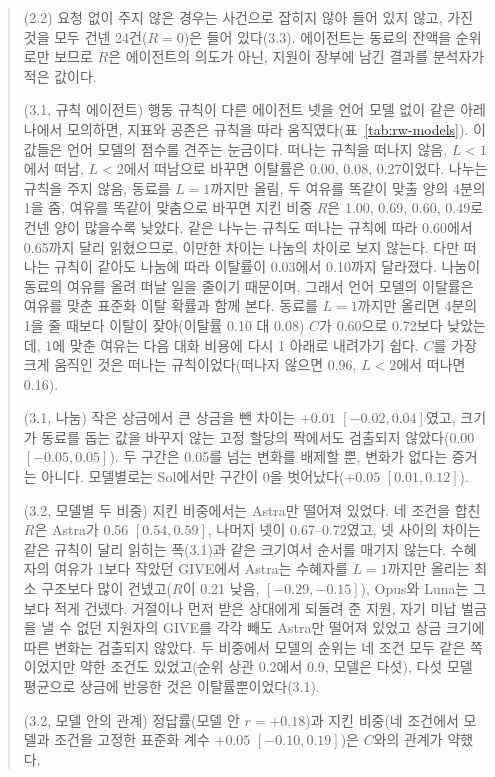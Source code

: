 \begin{quote}\small
{\color{black}
(2.2) 요청 없이 주지 않은 경우는 사건으로 잡히지 않아 들어 있지 않고, 가진 것을 모두 건넨 24건($R=0$)은 들어 있다(3.3). 에이전트는 동료의 잔액을 순위로만 보므로 $R$은 에이전트의 의도가 아닌, 지원이 장부에 남긴 결과를 분석자가 적은 값이다.

(3.1, 규칙 에이전트) 행동 규칙이 다른 에이전트 넷을 언어 모델 없이 같은 아레나에서 모의하면, 지표와 공존은 규칙을 따라 움직였다(표~\ref{tab:rw-models}). 이 값들은 언어 모델의 점수를 견주는 눈금이다. 떠나는 규칙을 떠나지 않음, $L<1$에서 떠남, $L<2$에서 떠남으로 바꾸면 이탈률은 0.00, 0.08, 0.27이었다. 나누는 규칙을 주지 않음, 동료를 $L=1$까지만 올림, 두 여유를 똑같이 맞출 양의 4분의 1을 줌, 여유를 똑같이 맞춤으로 바꾸면 지킨 비중 $R$은 1.00, 0.69, 0.60, 0.49로 건넨 양이 많을수록 낮았다. 같은 나누는 규칙도 떠나는 규칙에 따라 0.60에서 0.65까지 달리 읽혔으므로, 이만한 차이는 나눔의 차이로 보지 않는다. 다만 떠나는 규칙이 같아도 나눔에 따라 이탈률이 0.03에서 0.10까지 달라졌다. 나눔이 동료의 여유를 올려 떠날 일을 줄이기 때문이며, 그래서 언어 모델의 이탈률은 여유를 맞춘 표준화 이탈 확률과 함께 본다. 동료를 $L=1$까지만 올리면 4분의 1을 줄 때보다 이탈이 잦아(이탈률 0.10 대 0.08) $C$가 0.60으로 0.72보다 낮았는데, 1에 맞춘 여유는 다음 대화 비용에 다시 1 아래로 내려가기 쉽다. $C$를 가장 크게 움직인 것은 떠나는 규칙이었다(떠나지 않으면 0.96, $L<2$에서 떠나면 0.16).

(3.1, 나눔) 작은 상금에서 큰 상금을 뺀 차이는 $+0.01$ $[-0.02,0.04]$였고, 크기가 동료를 돕는 값을 바꾸지 않는 고정 할당의 짝에서도 검출되지 않았다($0.00$ $[-0.05,0.05]$). 두 구간은 0.05를 넘는 변화를 배제할 뿐, 변화가 없다는 증거는 아니다. 모델별로는 Sol에서만 구간이 0을 벗어났다($+0.05$ $[0.01,0.12]$).

(3.2, 모델별 두 비중) 지킨 비중에서는 Astra만 떨어져 있었다. 네 조건을 합친 $R$은 Astra가 0.56 $[0.54,0.59]$, 나머지 넷이 0.67--0.72였고, 넷 사이의 차이는 같은 규칙이 달리 읽히는 폭(3.1)과 같은 크기여서 순서를 매기지 않는다. 수혜자의 여유가 1보다 작았던 GIVE에서 Astra는 수혜자를 $L=1$까지만 올리는 최소 구조보다 많이 건넸고($R$이 0.21 낮음, $[-0.29,-0.15]$), Opus와 Luna는 그보다 적게 건넸다. 거절이나 먼저 받은 상대에게 되돌려 준 지원, 자기 미납 벌금을 낼 수 없던 지원자의 GIVE를 각각 빼도 Astra만 떨어져 있었고 상금 크기에 따른 변화는 검출되지 않았다. 두 비중에서 모델의 순위는 네 조건 모두 같은 쪽이었지만 약한 조건도 있었고(순위 상관 0.2에서 0.9, 모델은 다섯), 다섯 모델 평균으로 상금에 반응한 것은 이탈률뿐이었다(3.1).

(3.2, 모델 안의 관계) 정답률(모델 안 $r=+0.18$)과 지킨 비중(네 조건에서 모델과 조건을 고정한 표준화 계수 $+0.05$ $[-0.10,0.19]$)은 $C$와의 관계가 약했다.
}
\end{quote}

